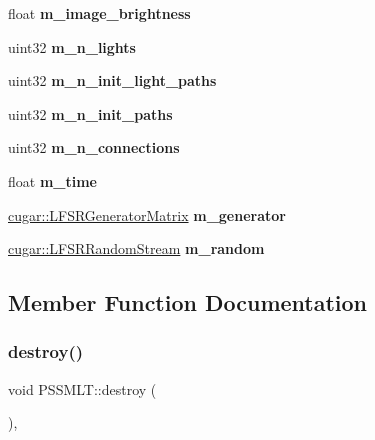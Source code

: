 \begin{DoxyCompactItemize}
float {\bfseries m\+\_\+image\+\_\+brightness}
\item 
\mbox{\label{struct_p_s_s_m_l_t_aa88f9ad534bf38922b5c7c6360dd7c2e}} 
uint32 {\bfseries m\+\_\+n\+\_\+lights}
\item 
\mbox{\label{struct_p_s_s_m_l_t_a41462b23a2a539043cf71ce9e9431198}} 
uint32 {\bfseries m\+\_\+n\+\_\+init\+\_\+light\+\_\+paths}
\item 
\mbox{\label{struct_p_s_s_m_l_t_a3490424fdca36b5292eaf1c0cadbda9f}} 
uint32 {\bfseries m\+\_\+n\+\_\+init\+\_\+paths}
\item 
\mbox{\label{struct_p_s_s_m_l_t_acd0dcbc12ae3b141c604d88c4deeaf98}} 
uint32 {\bfseries m\+\_\+n\+\_\+connections}
\item 
\mbox{\label{struct_p_s_s_m_l_t_abcc7a911d57f4b54b769bdc096cd7465}} 
float {\bfseries m\+\_\+time}
\item 
\mbox{\label{struct_p_s_s_m_l_t_ac59ec7e07b22690bef9125f2a8d3134a}} 
\hyperlink{classcugar_1_1_l_f_s_r_generator_matrix}{cugar\+::\+L\+F\+S\+R\+Generator\+Matrix} {\bfseries m\+\_\+generator}
\item 
\mbox{\label{struct_p_s_s_m_l_t_a625c03f7e916d96af731f3358a849590}} 
\hyperlink{structcugar_1_1_l_f_s_r_random_stream}{cugar\+::\+L\+F\+S\+R\+Random\+Stream} {\bfseries m\+\_\+random}
\end{DoxyCompactItemize}


\subsection{Member Function Documentation}
\mbox{\label{struct_p_s_s_m_l_t_a3dea533efa6d4ffd79e336131e83ba34}} 
\subsubsection{\texorpdfstring{destroy()}{destroy()}}
{\footnotesize\ttfamily void P\+S\+S\+M\+L\+T\+::destroy (\begin{DoxyParamCaption}{ }\end{DoxyParamCaption})\hspace{0.3cm}{\ttfamily [inline]}, {\ttfamily [virtual]}}

